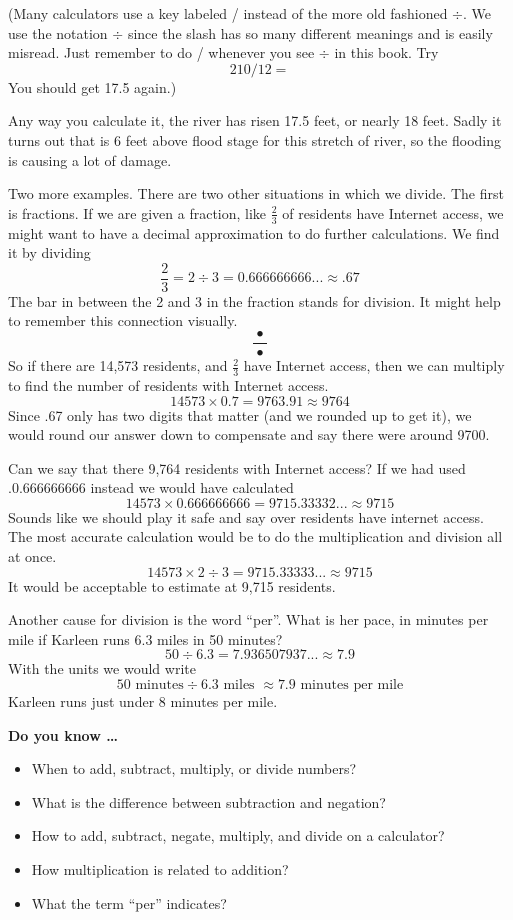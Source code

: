 (Many calculators use a key labeled / instead of the more old fashioned $\div$.  We use the notation $\div$ since the slash has so many different meanings and is easily misread.  Just remember to do / whenever you see $\div$ in this book. Try $$210 / 12 = $$ You should get 17.5 again.)

Any way you calculate it, the river has risen 17.5 feet, or nearly 18 feet. Sadly it turns out that is 6 feet above flood stage for this stretch of river, so the flooding is causing a lot of damage.

Two more examples.  There are two other situations in which we divide.  The first is fractions.  If we are given a fraction, like $\frac{2}{3}$ of residents have Internet access, we might want to have a decimal approximation to do further calculations.  We find it by dividing
$$\frac{2}{3} = 2 \div 3 = 0.666666666... \approx .67$$
The bar in between the 2 and 3 in the fraction stands for division. It might help to remember this connection visually.
$$\frac{~\bullet~}{\bullet}$$
So if there are 14,573 residents, and $\frac{2}{3}$ have Internet access, then we can multiply to find the number of residents with Internet access.
$$14573 \times 0.7 = 9763.91\approx 9764$$
Since .67 only has two digits that matter (and we rounded up to get it), we would round our answer down to compensate and say there were around 9700.

Can we say that there 9,764 residents with Internet access? If we had used .0.666666666 instead we would have calculated
$$14573 \times 0.666666666 = 9715.33332... \approx 9715$$
Sounds like we should play it safe and say over  residents have internet access.  The most accurate calculation would be to do the multiplication and division all at once.
$$14573 \times 2 \div 3 = 9715.33333... \approx 9715$$
It would be acceptable to estimate at 9,715 residents.

Another cause for division is the word ``per''.  What is her pace, in minutes per mile if Karleen runs 6.3 miles in 50 minutes? 
$$ 50 \div 6.3 =  7.936507937... \approx 7.9$$
With the units we would write
$$ 50 \text{ minutes} \div 6.3 \text{ miles }  \approx 7.9 \text{ minutes per mile}$$
Karleen runs just under 8 minutes per mile.

 

\noindent \textbf{Do you know \ldots}

\begin{itemize}
\item When to add, subtract, multiply, or divide numbers? %
\item What is the difference between subtraction and negation? %
\item How to add, subtract, negate, multiply, and divide on a calculator? %
\item How multiplication is related to addition? %
\item What the term ``per'' indicates? %
  
\end{itemize}


